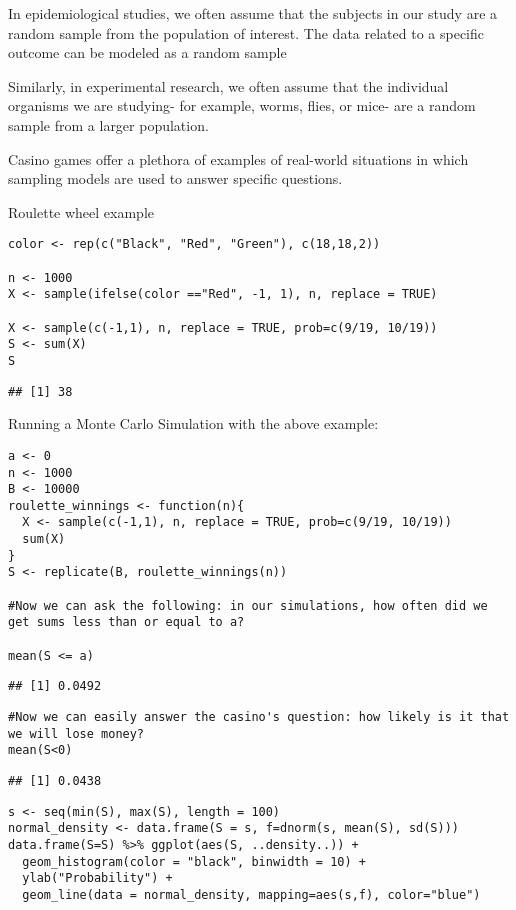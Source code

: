 \documentclass[
]{article}
\begin{document}
In epidemiological studies, we often assume that the subjects in our
study are a random sample from the population of interest. The data
related to a specific outcome can be modeled as a random sample

Similarly, in experimental research, we often assume that the individual
organisms we are studying- for example, worms, flies, or mice- are a
random sample from a larger population.

Casino games offer a plethora of examples of real-world situations in
which sampling models are used to answer specific questions.

Roulette wheel example

\begin{verbatim}
color <- rep(c("Black", "Red", "Green"), c(18,18,2))

n <- 1000
X <- sample(ifelse(color =="Red", -1, 1), n, replace = TRUE)

X <- sample(c(-1,1), n, replace = TRUE, prob=c(9/19, 10/19))
S <- sum(X)
S
\end{verbatim}

\begin{verbatim}
## [1] 38
\end{verbatim}

Running a Monte Carlo Simulation with the above example:

\begin{verbatim}
a <- 0
n <- 1000
B <- 10000
roulette_winnings <- function(n){
  X <- sample(c(-1,1), n, replace = TRUE, prob=c(9/19, 10/19))
  sum(X)
}
S <- replicate(B, roulette_winnings(n))

#Now we can ask the following: in our simulations, how often did we get sums less than or equal to a?

mean(S <= a)
\end{verbatim}

\begin{verbatim}
## [1] 0.0492
\end{verbatim}

\begin{verbatim}
#Now we can easily answer the casino's question: how likely is it that we will lose money?
mean(S<0)
\end{verbatim}

\begin{verbatim}
## [1] 0.0438
\end{verbatim}

\begin{verbatim}
s <- seq(min(S), max(S), length = 100)
normal_density <- data.frame(S = s, f=dnorm(s, mean(S), sd(S)))
data.frame(S=S) %>% ggplot(aes(S, ..density..)) +
  geom_histogram(color = "black", binwidth = 10) +
  ylab("Probability") +
  geom_line(data = normal_density, mapping=aes(s,f), color="blue")
\end{verbatim}
\end{document}
